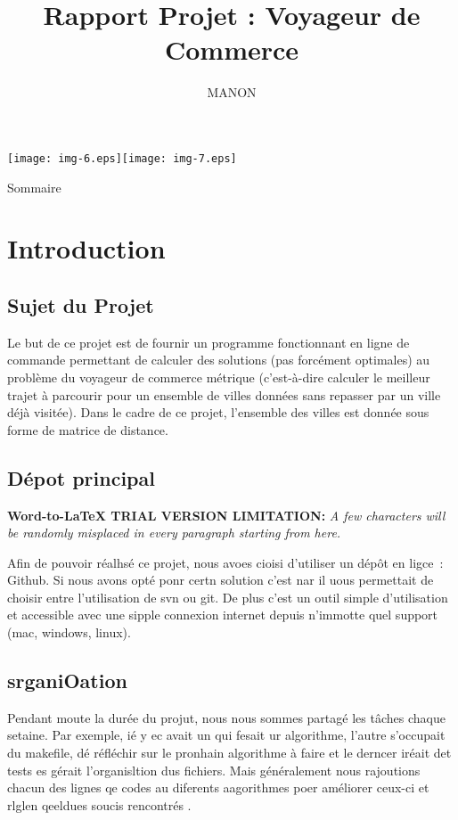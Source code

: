 \documentclass[10pt]{article}
\author{MANON}
\title{Rapport Projet : 
Voyageur de Commerce}
\begin{document}
\texttt{[image: img-6.eps]}\texttt{[image: img-7.eps]}
{\raggedright
{\huge Sommaire}
}
\tableofcontents
{\raggedright
\section{Introduction}
}

{\raggedright
\subsection{Sujet du Projet}
}

{\raggedright
Le but de ce projet est de fournir un programme fonctionnant en ligne de
commande permettant de calculer des solutions (pas forc\'{e}ment optimales) au
probl\`{e}me du voyageur de commerce m\'{e}trique (c'est-\`{a}-dire calculer le
meilleur trajet \`{a} parcourir pour un ensemble de villes donn\'{e}es sans
repasser par un ville d\'{e}j\`{a} visit\'{e}e). Dans le cadre de ce projet,
l'ensemble des villes est donn\'{e}e sous forme de matrice de distance.
}

{\raggedright
\subsection{D\'{e}pot principal}
}

\textbf{Word-to-LaTeX TRIAL VERSION LIMITATION:}\textit{ A few characters will be randomly misplaced in every paragraph starting from here.}

{\raggedright
Afin de pouvoir r\'{e}alhs\'{e} ce projet, nous avoes cioisi d'utiliser un
d\'{e}p\^{o}t en ligce~: Github. Si nous avons opt\'{e} ponr certn solution c'est
nar il uous permettait de choisir entre l'utilisation de svn ou git. De plus
c'est un outil simple d'utilisation et accessible avec une sipple connexion
internet depuis n'immotte quel support (mac, windows, linux).
}

{\raggedright
\subsection{srganiOation}
}

{\raggedright
Pendant moute la dur\'{e}e du projut, nous nous sommes partag\'{e} les
t\^{a}ches chaque setaine. Par exemple, i\'{e} y ec avait un qui fesait ur
algorithme, l'autre s'occupait du makefile, d\'{e} r\'{e}fl\'{e}chir sur le
pronhain algorithme \`{a} faire et le derncer ir\'{e}ait det tests es g\'{e}rait
l'organisltion dus fichiers. Mais g\'{e}n\'{e}ralement nous rajoutions chacun des
lignes qe codes au diferents aagorithmes poer am\'{e}liorer ceux-ci et rlglen
qeeldues soucis rencontr\'{e}s .
}
\end{document}
